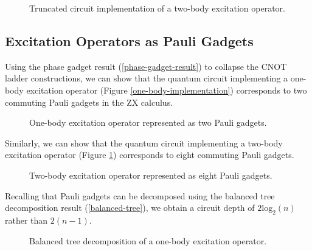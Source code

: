 \begin{figure}[H]
    \centering
    \caption{Truncated circuit implementation of a two-body excitation operator.}
    \label{two-body-implementation}
\end{figure}

\subsection{Excitation Operators as Pauli Gadgets}%
\label{excitation-operators-pauli-gadgets}

Using the phase gadget result (\ref{phase-gadget-result}) to collapse the CNOT ladder constructions, we can show that the quantum circuit implementing a one-body excitation operator (Figure \ref{one-body-implementation}) corresponds to two commuting Pauli gadgets in the ZX calculus.

\begin{figure}[H]
    \centering
    \caption{One-body excitation operator represented as two Pauli gadgets.}
\end{figure}


Similarly, we can show that the quantum circuit implementing a two-body excitation operator (Figure \ref{two-body-implementation}) corresponds to eight commuting Pauli gadgets.


\begin{figure}[H]
    \centering
    \caption{Two-body excitation operator represented as eight Pauli gadgets.}
\end{figure}


Recalling that Pauli gadgets can be decomposed using the balanced tree decomposition result (\ref{balanced-tree}), we obtain a circuit depth of $2\text{log}_2(n)$ rather than $2(n-1)$.

\begin{figure}[H]
    \centering
    \caption{Balanced tree decomposition of a one-body excitation operator.}
\end{figure}

